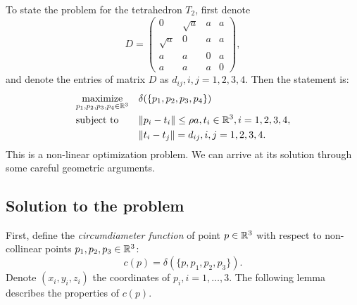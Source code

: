 \noindent To state the problem for the tetrahedron $T_2$, first denote 
$$D = \begin{pmatrix}
0 & \sqrt a & a & a \\
\sqrt a & 0 & a & a \\
a & a & 0 & a\\
a & a & a & 0
\end{pmatrix},
$$
and denote the entries of matrix $D$ as $d_{ij}, i,j=1,2,3,4$. Then the statement is:
\begin{equation}\label{prob:tetra2}
\begin{aligned}
& \underset{p_1,p_2,p_3,p_4\in {\mathbb R^3}}{\text{maximize}}
& & \delta(\{p_1,p_2,p_3,p_4\}) \\
& \text{subject to}
& & \|p_i - t_i\| \leq \rho a, t_i\in {\mathbb R^3}, i=1,2,3,4, \\
& & & \|t_i-t_j\| = d_{ij}, i,j=1,2,3,4.\\
\end{aligned}
\end{equation}
This is a non-linear optimization problem. We can arrive at its solution through some careful geometric arguments.

\subsection{Solution to the problem}
First, define the \textit{circumdiameter function} of point $p \in {\mathbb R^3}$ with respect to non-collinear points $p_1,p_2,p_3 \in {\mathbb R^3}$:
$$c(p) = \delta(\{p,p_1,p_2,p_3\}).$$
Denote $(x_i,y_i,z_i)$ the coordinates of $p_i, i=1,\dots,3$. The following lemma describes the properties of $c(p)$.

